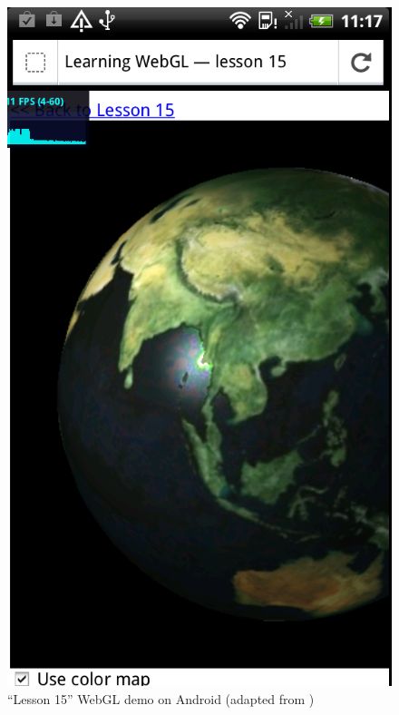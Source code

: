 \documentclass[12pt,journal,compsoc]{IEEEtran}
\begin{document}
\begin{figure}[htb]
	\begin{center}
	\includegraphics[width=0.7\columnwidth]{grafiken/lesson15_Android}
      \caption{“Lesson 15” WebGL demo on Android (adapted from \cite{lesson15})}
      \label{fig:lesson15_Android}
    \end{center}
\end{figure}
\end{document}
